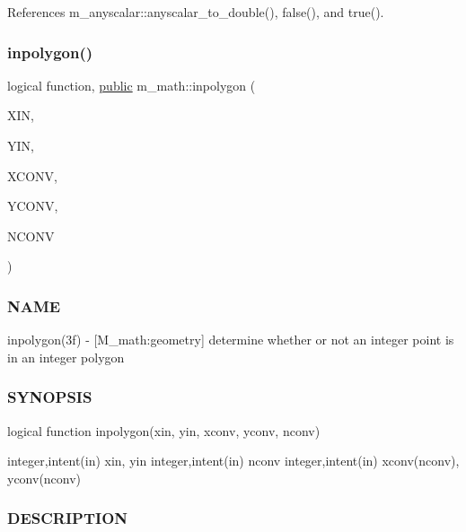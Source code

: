 References m\+\_\+anyscalar\+::anyscalar\+\_\+to\+\_\+double(), false(), and true().

\mbox{\label{namespacem__math_a8a690554ceefdd859166fd1c44b40969}} 
\subsubsection{\texorpdfstring{inpolygon()}{inpolygon()}}
{\footnotesize\ttfamily logical function, \hyperlink{M__stopwatch_83_8txt_a2f74811300c361e53b430611a7d1769f}{public} m\+\_\+math\+::inpolygon (\begin{DoxyParamCaption}\item[{integer, intent(\hyperlink{M__journal_83_8txt_afce72651d1eed785a2132bee863b2f38}{in})}]{X\+IN,  }\item[{integer, intent(\hyperlink{M__journal_83_8txt_afce72651d1eed785a2132bee863b2f38}{in})}]{Y\+IN,  }\item[{integer, dimension(nconv)}]{X\+C\+O\+NV,  }\item[{integer, dimension(nconv)}]{Y\+C\+O\+NV,  }\item[{integer, intent(\hyperlink{M__journal_83_8txt_afce72651d1eed785a2132bee863b2f38}{in})}]{N\+C\+O\+NV }\end{DoxyParamCaption})}



\subsubsection*{N\+A\+ME}

inpolygon(3f) -\/ \mbox{[}M\+\_\+math\+:geometry\mbox{]} determine whether or not an integer point is in an integer polygon 

\subsubsection*{S\+Y\+N\+O\+P\+S\+IS}

\begin{DoxyVerb} logical function inpolygon(xin, yin, xconv, yconv, nconv)

  integer,intent(in)  xin, yin
  integer,intent(in)  nconv
  integer,intent(in)  xconv(nconv), yconv(nconv)
\end{DoxyVerb}


\subsubsection*{D\+E\+S\+C\+R\+I\+P\+T\+I\+ON}

